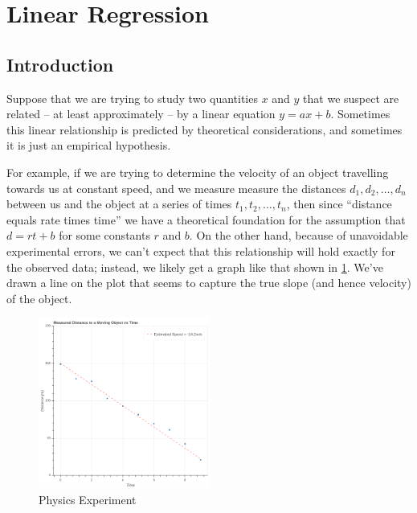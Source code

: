 \documentclass[
]{article}
\author{}
\date{}
\begin{document}
\newcommand{\df}[1]{\frac{\partial}{\partial #1}}

\hypertarget{linear-regression}{%
\section{Linear Regression}\label{linear-regression}}

\hypertarget{sec:Intro}{%
\subsection{Introduction}\label{sec:Intro}}

Suppose that we are trying to study two quantities \(x\) and \(y\) that
we suspect are related -- at least approximately -- by a linear equation
\(y=ax+b\). Sometimes this linear relationship is predicted by
theoretical considerations, and sometimes it is just an empirical
hypothesis.

For example, if we are trying to determine the velocity of an object
travelling towards us at constant speed, and we measure measure the
distances \(d_1, d_2, \ldots, d_n\) between us and the object at a
series of times \(t_1, t_2, \ldots, t_n\), then since ``distance equals
rate times time'' we have a theoretical foundation for the assumption
that \(d=rt+b\) for some constants \(r\) and \(b\). On the other hand,
because of unavoidable experimental errors, we can't expect that this
relationship will hold exactly for the observed data; instead, we likely
get a graph like that shown in \cref{fig:dvt}. We've drawn a line on the
plot that seems to capture the true slope (and hence velocity) of the
object.

\begin{figure}
\hypertarget{fig:dvt}{%
\centering
\includegraphics[width=0.5\textwidth,height=\textheight]{../img/distance-vs-time.png}
\caption{Physics Experiment}\label{fig:dvt}
}
\end{figure}
\end{document}
